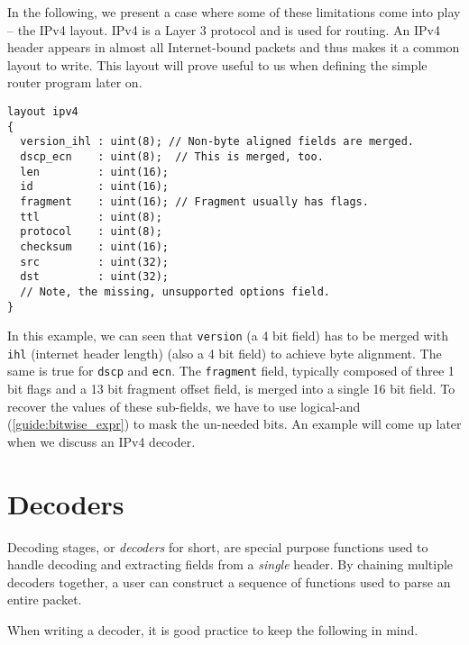In the following, we present a case where some of these limitations come into play -- the IPv4 layout. IPv4 is a Layer 3 protocol \cite{osi_model} and is used for routing. An IPv4 header appears in almost all Internet-bound packets and thus makes it a common layout to write. This layout will prove useful to us when defining the simple router program later on.

\begin{codepage}
\begin{lstlisting}
layout ipv4
{
  version_ihl : uint(8); // Non-byte aligned fields are merged.
  dscp_ecn    : uint(8);  // This is merged, too.
  len         : uint(16);
  id          : uint(16);
  fragment    : uint(16); // Fragment usually has flags.
  ttl         : uint(8);
  protocol    : uint(8);
  checksum    : uint(16);
  src         : uint(32);
  dst         : uint(32);
  // Note, the missing, unsupported options field.
}
\end{lstlisting}
\end{codepage}

In this example, we can seen that \texttt{version} (a 4 bit field) has to be merged with \texttt{ihl} (internet header length) (also a 4 bit field) to achieve byte alignment. The same is true for \texttt{dscp} and \texttt{ecn}. The \texttt{fragment} field, typically composed of three 1 bit flags and a 13 bit fragment offset field, is merged into a single 16 bit field. To recover the values of these sub-fields, we have to use logical-and (\ref{guide:bitwise_expr}) to mask the un-needed bits. An example will come up later when we discuss an IPv4 decoder.

\section{Decoders} \label{tut:decoder}

Decoding stages, or \textit{decoders} for short, are special purpose functions used to handle decoding and extracting fields from a \textit{single} header. By chaining multiple decoders together, a user can construct a sequence of functions used to parse an entire packet. 

When writing a decoder, it is good practice to keep the following in mind.


